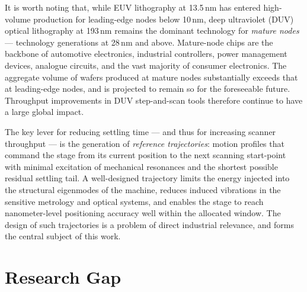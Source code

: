 It is worth noting that, while EUV lithography at 13.5\,nm has entered high-volume production for leading-edge nodes below 10\,nm, deep ultraviolet (DUV) optical lithography at 193\,nm remains the dominant technology for \textit{mature nodes} — technology generations at 28\,nm and above. Mature-node chips are the backbone of automotive electronics, industrial controllers, power management devices, analogue circuits, and the vast majority of consumer electronics. The aggregate volume of wafers produced at mature nodes substantially exceeds that at leading-edge nodes, and is projected to remain so for the foreseeable future. Throughput improvements in DUV step-and-scan tools therefore continue to have a large global impact.

The key lever for reducing settling time — and thus for increasing scanner throughput — is the generation of \textit{reference trajectories}: motion profiles that command the stage from its current position to the next scanning start-point with minimal excitation of mechanical resonances and the shortest possible residual settling tail. A well-designed trajectory limits the energy injected into the structural eigenmodes of the machine, reduces induced vibrations in the sensitive metrology and optical systems, and enables the stage to reach nanometer-level positioning accuracy well within the allocated window. The design of such trajectories is a problem of direct industrial relevance, and forms the central subject of this work.

\section{Research Gap}\label{sec:intro_gap}

